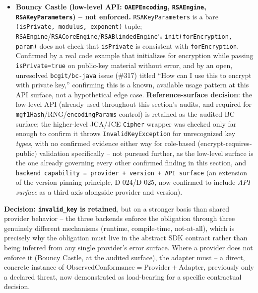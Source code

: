 \documentclass[11pt,a4paper]{article}
\begin{document}
\begin{itemize}
\item \textbf{Bouncy Castle (low-level API: \texttt{OAEPEncoding}, \texttt{RSAEngine}, \texttt{RSAKeyParameters}) -- not enforced.} \texttt{RSAKeyParameters} is a bare \texttt{(isPrivate, modulus, exponent)} tuple; \texttt{RSAEngine}/\texttt{RSACoreEngine}/\texttt{RSABlindedEngine}'s \texttt{init(forEncryption, param)} does not check that \texttt{isPrivate} is consistent with \texttt{forEncryption}. Confirmed by a real code example that initializes for encryption while passing \texttt{isPrivate=true} on public-key material without error, and by an open, unresolved \texttt{bcgit/bc-java} issue (\#317) titled ``How can I use this to encrypt with private key,'' confirming this is a known, available usage pattern at this API surface, not a hypothetical edge case. \textbf{Reference-surface decision}: the low-level API (already used throughout this section's audits, and required for \texttt{mgf1Hash}/RNG/\texttt{encodingParams} control) is retained as the audited BC surface; the higher-level JCA/JCE \texttt{Cipher} wrapper was checked only far enough to confirm it throws \texttt{InvalidKeyException} for unrecognized key \emph{types}, with no confirmed evidence either way for role-based (encrypt-requires-public) validation specifically -- not pursued further, as the low-level surface is the one already governing every other confirmed finding in this section, and \texttt{backend capability = provider + version + API surface} (an extension of the version-pinning principle, D-024/D-025, now confirmed to include \emph{API surface} as a third axis alongside provider and version).
\end{itemize}

\textbf{Decision: \texttt{invalid\_key} is retained}, but on a stronger basis than shared provider behavior -- the three backends enforce the obligation through three genuinely different mechanisms (runtime, compile-time, not-at-all), which is precisely why the obligation must live in the abstract SDK contract rather than being inferred from any single provider's error surface. Where a provider does not enforce it (Bouncy Castle, at the audited surface), the adapter must -- a direct, concrete instance of $\text{ObservedConformance} = \text{Provider} + \text{Adapter}$, previously only a declared threat, now demonstrated as load-bearing for a specific contractual decision.
\end{document}
